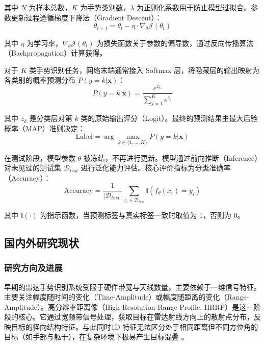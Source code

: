 其中 $N$ 为样本总数，$K$ 为手势类别数，$\lambda$ 为正则化系数用于防止模型过拟合。参数更新过程遵循梯度下降法（Gradient Descent）：
\begin{equation}
    \theta_{t+1} = \theta_t - \eta \cdot \nabla_\theta \mathcal{J}(\theta_t)
\end{equation}

其中 $\eta$ 为学习率，$\nabla_\theta \mathcal{J}(\theta_t)$ 为损失函数关于参数的偏导数，通过反向传播算法\cite{rumelhart1986learning}（Backpropagation）计算获得。

对于 $K$ 类手势识别任务，网络末端通常接入 Softmax 层，将隐藏层的输出映射为各类别的概率预测分布 $P(y=k|\mathbf{x})$：
\begin{equation}
    P(y=k|\mathbf{x}) = \frac{e^{z_k}}{\sum_{j=1}^K e^{z_j}}
\end{equation}

其中 $z_k$ 是分类层对第 $k$ 类的原始输出评分（Logit）。最终的预测结果由最大后验概率（MAP）准则决定：
\begin{equation}
    \text{Label} = \arg\max_{k \in \{1, \dots, K\}} P(y=k|\mathbf{x})
\end{equation}

在测试阶段，模型参数 $\theta$ 被冻结，不再进行更新。模型通过前向推断（Inference）对未见过的测试集 $\mathcal{D}_{test}$ 进行泛化能力评估。核心评价指标为分类准确率（Accuracy）：
\begin{equation}
    \text{Accuracy} = \frac{1}{|\mathcal{D}_{test}|} \sum_{x_i \in \mathcal{D}_{test}} \mathbb{I}(f_\theta(x_i) = y_i)
\end{equation}

其中 $\mathbb{I}(\cdot)$ 为指示函数，当预测标签与真实标签一致时取值为 1，否则为 0。

\subsection{国内外研究现状}

\subsubsection{研究方向及进展}
早期的雷达手势识别系统受限于硬件带宽与天线数量，主要依赖于一维信号特征。主要关注幅度随时间的变化（Time-Amplitude）或幅度随距离的变化（Range-Amplitude）。高分辨率距离像（High-Resolution Range Profile, HRRP）是这一阶段的核心\cite{1453769}。它通过宽频带信号处理，获取目标在雷达射线方向上的散射点分布，反映目标的径向结构特征。与此同时1D 特征无法区分处于相同距离但不同方位角的目标（如手部与躯干），在复杂环境下极易产生目标混叠 。

